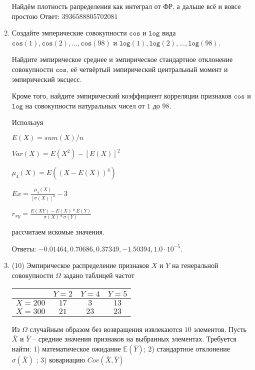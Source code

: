 \documentclass[a4paper,12pt]{article}
\begin{document}
\begin{enumerate}
Найдём плотность рапределения как интеграл от ФР, а дальше всё и вовсе простою Ответ: $3936588805702081$


\item

    
    Создайте эмперические совокупности  $\mathtt{\text{cos}}$ и $\mathtt{\text{log}}$ вида $\mathtt{\text{cos}}(1),\mathtt{\text{cos}}(2), ..., \mathtt{\text{cos}}(98) $ и $\mathtt{\text{log}}(1),\mathtt{\text{log}}(2), ..., \mathtt{\text{log}}(98). $

    Найдите эмпирическое среднее и эмпирическое стандартное отклонение совокупности $\mathtt{\text{cos}}$, её четвёртый эмпирический центральный момент и эмпирический эксцесс.

    Кроме того, найдите эмпирический коэффициент корреляции признаков $\mathtt{\text{cos}}$ и $\mathtt{\text{log}}$ на совокупности натуральных чисел от $1$ до $98$.
    


    
    Используя

	$E(X) = sum(X) / n$

	$Var(X) = E(X^2) - [E(X)]^2$

	$\mu_4(X) = E((X-E(X))^4)$

	$Ex = \frac{\mu_4(X)}{[\sigma(X)]^4} - 3$

	$r_{xy} = \frac{E(XY) - E(X) * E(Y)}{\sigma(X) * \sigma(Y)}$

    рассчитаем искомые значения.

    Ответы: $-0.01464, 0.70686, 0.37349, -1.50394, 1.0 \cdot 10^{-5}$.

    

\item


(10) Эмпирическое распределение признаков $X$ и $Y$ на генеральной совокупности $\Omega$ задано таблицей частот  
 
\begin{tabular}{ | c | c | c | c | }
\hline
 & $Y = 2$ & $Y = 4$ & $Y = 5$  \\ \hline
$X = 200$ & $17$ & $3$ & $13$\\ \hline
$X = 300$ & $21$ & $23$ & $23$\\
\hline
\end{tabular}

Из $\Omega$ случайным образом без возвращения извлекаются $10$ элементов. 
Пусть $\bar X$ и $\bar Y$ – средние значения признаков на выбранных элементах. 
Требуется найти: 1) математическое ожидание $\mathbb{E}(\bar Y)$; 2) стандартное отклонение $\sigma(\bar X)$ ; 
3) ковариацию $Cov(\bar X, \bar Y)$





\end{enumerate}
\end{document}
